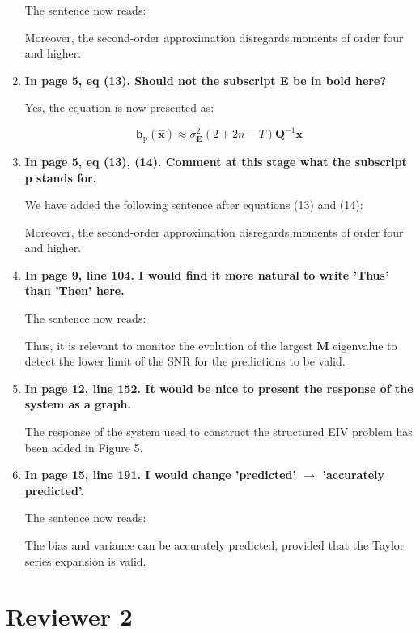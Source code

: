 \documentclass[11pt]{article}
\begin{document}
\begin{enumerate}
The sentence now reads:

\color{blue} 
Moreover, the second-order approximation disregards moments of order four and higher.
\color{black} 

\item  \textbf{In page 5, eq (13). Should not the subscript E be in bold here?}

Yes, the equation is now presented as:

\color{blue} 
\begin{equation} \mathbf{b}_{\mathrm{p}} \left( \widehat{\mathbf{x}} \right) \approx \sigma_{\mathbf{E}}^2 \left( 2 + 2n - T \right) \mathbf{Q}^{-1} \mathbf{x} \tag{13} \end{equation}
\color{black} 

\item \textbf{In page 5, eq (13), (14). Comment at this stage what the subscript p stands for.}

We have added the following sentence after equations (13) and (14):

\color{blue} 
Moreover, the second-order approximation disregards moments of order four and higher.
\color{black} 

\item \textbf{In page 9, line 104. I would find it more natural to write 'Thus' than 'Then' here.}

The sentence now reads:

\color{blue} 
Thus, it is relevant to monitor the evolution of the largest $\mathbf{M}$ eigenvalue to detect the lower limit of the SNR for the predictions to be valid.

\color{black} 

\item \textbf{In page 12, line 152. It would be nice to present the response of the system as a
graph.}

The response of the system used to construct the structured EIV problem has been added in Figure 5.

\item \textbf{In page 15, line 191. I would change 'predicted' $\rightarrow$ 'accurately predicted'.}

The sentence now reads:

\color{blue} 
The bias and variance can be accurately predicted, provided that the Taylor series expansion is valid.
\color{black} 

\end{enumerate}


\section*{Reviewer 2}
\end{document}
